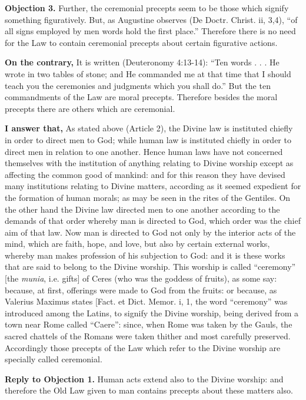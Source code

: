 \textbf{Objection 3.} Further, the ceremonial precepts seem to be those which signify something figuratively. But, as Augustine observes (De Doctr. Christ. ii, 3,4), ``of all signs employed by men words hold the first place.'' Therefore there is no need for the Law to contain ceremonial precepts about certain figurative actions.

\textbf{On the contrary,} It is written (Deuteronomy 4:13-14): ``Ten words . . . He wrote in two tables of stone; and He commanded me at that time that I should teach you the ceremonies and judgments which you shall do.'' But the ten commandments of the Law are moral precepts. Therefore besides the moral precepts there are others which are ceremonial.

\textbf{I answer that,} As stated above (Article 2), the Divine law is instituted chiefly in order to direct men to God; while human law is instituted chiefly in order to direct men in relation to one another. Hence human laws have not concerned themselves with the institution of anything relating to Divine worship except as affecting the common good of mankind: and for this reason they have devised many institutions relating to Divine matters, according as it seemed expedient for the formation of human morals; as may be seen in the rites of the Gentiles. On the other hand the Divine law directed men to one another according to the demands of that order whereby man is directed to God, which order was the chief aim of that law. Now man is directed to God not only by the interior acts of the mind, which are faith, hope, and love, but also by certain external works, whereby man makes profession of his subjection to God: and it is these works that are said to belong to the Divine worship. This worship is called ``ceremony'' [the \emph{munia}, i.e. gifts] of Ceres (who was the goddess of fruits), as some say: because, at first, offerings were made to God from the fruits: or because, as Valerius Maximus states [Fact. et Dict. Memor. i, 1, the word ``ceremony'' was introduced among the Latins, to signify the Divine worship, being derived from a town near Rome called ``Caere'': since, when Rome was taken by the Gauls, the sacred chattels of the Romans were taken thither and most carefully preserved. Accordingly those precepts of the Law which refer to the Divine worship are specially called ceremonial.

\textbf{Reply to Objection 1.} Human acts extend also to the Divine worship: and therefore the Old Law given to man contains precepts about these matters also.

